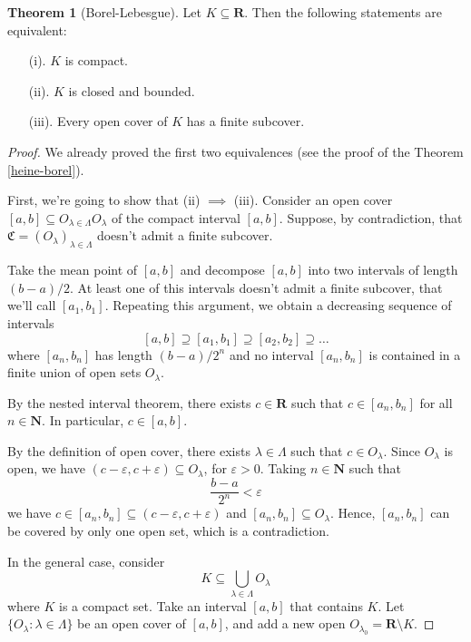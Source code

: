 \documentclass[tikz,12pt,a4paper]{article}
\theoremstyle{definition}
\newtheorem{theorem}{Theorem}[section]
\begin{document}
\begin{theorem}[Borel-Lebesgue]
	Let $K \subseteq \textbf{R}$. Then the following statements are equivalent:
	\begin{itemize}
		\item[(i).] $K$ is compact.
		\item[(ii).] $K$ is closed and bounded.
		\item[(iii).] Every open cover of $K$ has a finite subcover.
	\end{itemize}
\end{theorem}

\begin{proof}
	We already proved the first two equivalences (see the proof of the Theorem \ref{heine-borel}). 
	
	First, we're going to show that (ii) $\implies$ (iii). Consider an open cover $[a,b] \subseteq O_{\lambda \in \Lambda} O_\lambda$ of the compact interval $[a,b]$. Suppose, by contradiction, that $\mathfrak{C} = (O_\lambda)_{\lambda \in \Lambda}$ doesn't admit a finite subcover.
	
	Take the mean point of $[a,b]$ and decompose $[a,b]$ into two intervals of length $(b-a)/2$. At least one of this intervals doesn't admit a finite subcover, that we'll call $[a_1, b_1]$. Repeating this argument, we obtain a decreasing sequence of intervals
	\[
		[a,b] \supseteq [a_1, b_1] \supseteq [a_2, b_2] \supseteq \ldots
	\]
	where $[a_n, b_n]$ has length $(b-a)/2^n$ and no interval $[a_n, b_n]$ is contained in a finite union of open sets $O_\lambda$.
	
	By the nested interval theorem, there exists $c \in \textbf{R}$ such that $c \in [a_n, b_n]$ for all $n \in \textbf{N}$. In particular, $c \in [a,b]$.
	
	By the definition of open cover, there exists $\lambda \in \Lambda$ such that $c \in O_\lambda$. Since $O_\lambda$ is open, we have $(c-\varepsilon, c+\varepsilon) \subseteq O_\lambda$, for $\varepsilon > 0$. Taking $n \in \textbf{N}$ such that
	\[
		\frac{b-a}{2^n} < \varepsilon
	\]
	we have $c \in [a_n, b_n] \subseteq (c-\varepsilon, c+\varepsilon)$ and $[a_n, b_n] \subseteq O_\lambda$. Hence, $[a_n, b_n]$ can be covered by only one open set, which is a contradiction. 
	
	In the general case, consider
	\[
		K \subseteq \bigcup_{\lambda \in \Lambda} O_\lambda
	\]
	where $K$ is a compact set. Take an interval $[a,b]$ that contains $K$. Let $\{ O_\lambda : \lambda \in \Lambda \}$ be an open cover of $[a,b]$, and add a new open $O_{\lambda_0} = \textbf{R} \setminus K$.
	

\end{proof}
\end{document}
